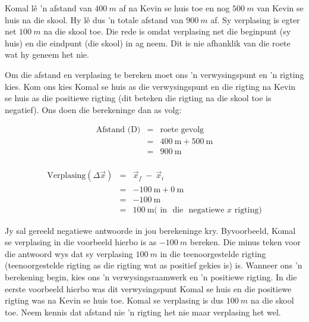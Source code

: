 Komal l\^e  'n afstand van $400~m$ af na Kevin se huis toe en nog $500~m$ van Kevin se huis na die skool. Hy l\^e dus  'n totale afstand van $900~m$ af. Sy verplasing is egter net $100~m$ na die skool toe. Die rede is omdat verplasing net die beginpunt (sy huis) en die eindpunt (die skool) in ag neem. Dit is nie afhanklik van die roete wat hy geneem het nie.

Om die afstand en verplasing te bereken moet ons  'n verwysingspunt en  'n rigting kies. Kom ons kies Komal se huis as die verwysingspunt en die rigting na Kevin se huis as die positiewe rigting (dit beteken die rigting na die skool toe is negatief). Ons doen die berekeninge dan as volg:\par 
\begin{minipage}{0.35\textwidth}
\begin{eqnarray*}
\text{Afstand (D)} &=& \text{roete gevolg}\\
&=&400\ \text{m} + 500\ \text{m}\\
&=&900\ \text{m}\\
\end{eqnarray*}
\end{minipage}
\begin{minipage}{0.65\textwidth}
\begin{eqnarray*}
\text{Verplasing} (\Delta \vec{x}) &=& \vec{x}_f~ - ~ \vec{x}_i\\
&=&-100\ \text{m} + 0\ \text{m}\\
&=&-100\ \text{m}\\
&=&100\ \text{m} \text{( in ~die~ negatiewe~} x \text{~rigting)}
\end{eqnarray*}
\end{minipage}\par


Jy sal gereeld negatiewe antwoorde in jou berekeninge kry. Byvoorbeeld, Komal se verplasing in die voorbeeld hierbo is as $-100~m$ bereken. Die minus teken voor die antwoord wys dat sy verplasing $100~m$ in die teenoorgestelde rigting (teenoorgestelde rigting as die rigting wat as positief gekies is) is. Wanneer ons  'n berekening begin, kies ons  'n verwysingsraamwerk en  'n positiewe rigting. In die eerste voorbeeld hierbo was dit verwysingspunt Komal se huis en die positiewe rigting was na Kevin se huis toe. Komal se verplasing is dus $100~m$ na die skool toe. Neem kennis dat afstand nie  'n rigting het nie maar verplasing het wel.\par


